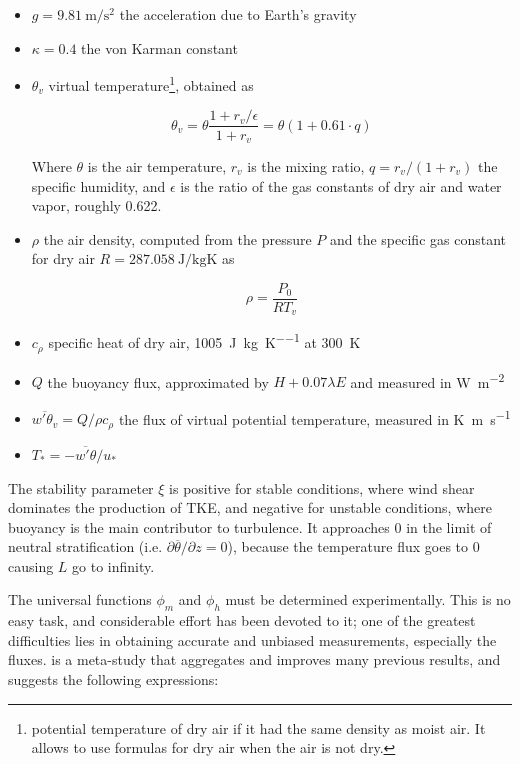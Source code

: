 \documentclass[a4paper]{book}
\begin{document}
\begin{itemize}
\item $g=\SI{9.81}{\meter\per\square\second}$ the acceleration due to Earth's gravity
\item $\kappa=0.4$ the von Karman constant

\item $\theta_v$ virtual temperature\footnote{potential temperature of dry air if it had the same density as moist air. It allows to use formulas for dry air when the air is not dry.}, obtained as

\begin{equation}
\label{eq:vtemp}
\theta_v=\theta\frac{1+r_v/\epsilon}{1+r_v}=\theta(1+0.61\cdot q)
\end{equation}

Where $\theta$ is the air temperature, $r_v$ is the mixing ratio, $q=r_v/(1+r_v)$ the specific humidity, and $\epsilon$ is the ratio of the gas constants of dry air and water vapor, roughly 0.622.

\item $\rho$ the air density, computed from the pressure $P$ and the specific gas constant for dry air $R=\SI{287.058}{\joule\per\kilo\gram\kelvin}$ as

$$
\rho=\frac{P_0}{RT_v}
$$


\item $c_\rho$ specific heat of dry air, \SI{1005}{\joule\per\kilo\gram\per\kelvin} at \SI{300}{\kelvin}
\item $Q$ the buoyancy flux, approximated by $H+0.07\lambda E$ and measured in \si{\watt\per\square\meter}
\item $\overline{w'\theta_v}=Q/\rho c_\rho$ the flux of virtual potential temperature, measured in \si{\kelvin\meter\per\second}
\item $T_*=-\overline{w'\theta}/u_*$
\end{itemize}

The stability parameter $\xi$ is positive for stable conditions, where wind shear dominates the production of TKE, and negative for unstable conditions, where buoyancy is the main contributor to turbulence. It approaches 0 in the limit of neutral stratification (i.e. $\partial\overline{\theta}/\partial z=0$), because the temperature flux goes to 0 causing $L$ go to infinity.

The universal functions $\phi_m$ and $\phi_h$ must be determined experimentally. This is no easy task, and considerable effort has been devoted to it; one of the greatest difficulties lies in obtaining accurate and unbiased measurements, especially the fluxes. \cite{hogstrom88} is a meta-study that aggregates and improves many previous results, and suggests the following expressions:
\end{document}
